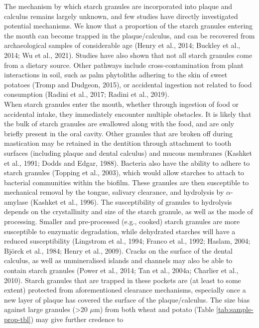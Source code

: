 \documentclass[utf8]{frontiers/frontiersSCNS}
\begin{document}
The mechanism by which starch granules are incorporated into plaque and calculus
remains largely unknown, and few studies have directly investigated potential
mechanisms. We know that a proportion of the starch granules entering
the mouth can become trapped in the plaque/calculus, and can be recovered from
archaeological samples of considerable age
(Henry et al., 2014; Buckley et al., 2014; Wu et al., 2021).
Studies have also shown that not all starch granules come from a dietary source.
Other pathways include cross-contamination from plant interactions in soil, such
as palm phytoliths adhering to the skin of sweet potatoes
(Tromp and Dudgeon, 2015),
or accidental ingestion not related to food consumption
(Radini et al., 2017; Radini et al., 2019).\\
When starch granules enter the mouth, whether through ingestion of food or accidental
intake, they immediately encounter multiple obstacles. It is likely
that the bulk of starch granules are swallowed along with the food, and are
only briefly present in the oral cavity. Other granules that are broken off
during mastication may be retained in the dentition through attachment to
tooth surfaces (including plaque and dental calculus) and mucous membranes
(Kashket et al., 1991; Dodds and Edgar, 1988).
Bacteria also have the ability to adhere to starch granules
(Topping et al., 2003),
which would allow starches to attach to bacterial communities within the biofilm.
These granules are then
susceptible to mechanical removal by the tongue, salivary clearance, and hydrolysis
by \(\alpha\)-amylase (Kashket et al., 1996).
The susceptibility of granules to hydrolysis depends on the crystallinity and size
of the starch granule, as well as the mode of processing. Smaller and pre-processed
(e.g., cooked) starch granules are more susceptible to enzymatic degradation,
while dehydrated starches will have a reduced susceptibility
(Lingstrom et al., 1994; Franco et al., 1992; Haslam, 2004; Björck et al., 1984; Henry et al., 2009).
Cracks on the surface of the dental calculus, as well as unmineralised islands
and channels may also be able to contain starch granules
(Power et al., 2014; Tan et al., 2004a; Charlier et al., 2010).
Starch granules that are trapped in these pockets are (at least to some extent)
protected from aforementioned clearance mechanisms, especially once
a new layer of plaque has covered the surface of the plaque/calculus.
The size bias against large granules (\textgreater20 \(\mu\)m) from both wheat and potato
(Table \ref{tab:sample-prop-tbl}) may give further credence to
\end{document}
